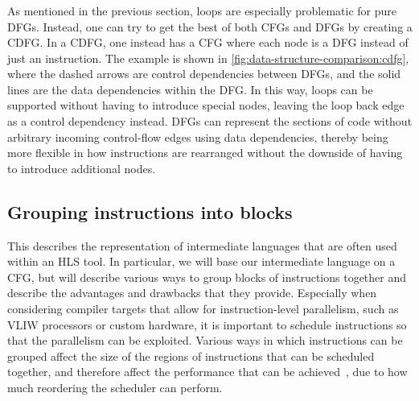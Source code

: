 \subsubsection{}

As mentioned in the previous section, loops are especially problematic for pure
\glspl{DFG}.  Instead, one can try to get the best of both \glspl{CFG} and
\glspl{DFG} by creating a \gls{CDFG}.  In a \gls{CDFG}, one instead has a
\gls{CFG} where each node is a \gls{DFG} instead of just an instruction.  The
example is shown in \cref{fig:data-structure-comparison:cdfg}, where the dashed
arrows are control dependencies between \glspl{DFG}, and the solid lines are the
data dependencies within the \gls{DFG}.  In this way, loops can be supported
without having to introduce special nodes, leaving the loop back edge as a
control dependency instead. \Glspl{DFG} can represent the sections of code
without arbitrary incoming control-flow edges using data dependencies, thereby
being more flexible in how instructions are rearranged without the downside of
having to introduce additional nodes.

\subsection{Grouping instructions into blocks}%
\label{sec:bg:intermediate-language}

This  describes the representation of
intermediate languages that are often used within an \gls{HLS} tool.  In
particular, we will base our intermediate language on a \gls{CFG}, but will
describe various ways to group blocks of instructions together and describe the
advantages and drawbacks that they provide.  Especially when considering
compiler targets that allow for instruction-level parallelism, such as
\gls{VLIW} processors or custom hardware, it is important to schedule
instructions so that the parallelism can be exploited.  Various ways in which
instructions can be grouped affect the size of the regions of instructions that
can be scheduled together, and therefore affect the performance that can be
achieved~\cite{faraboschi01_isilpp}, due to how much reordering the scheduler
can perform.

